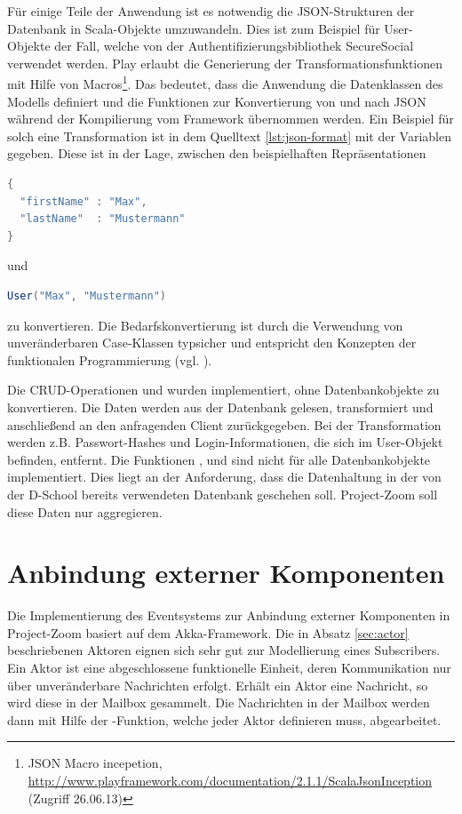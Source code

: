 Für einige Teile der Anwendung ist es notwendig die JSON-Strukturen der Datenbank in Scala-Objekte umzuwandeln. Dies ist zum Beispiel für User-Objekte der Fall, welche von der Authentifizierungsbibliothek SecureSocial verwendet werden. Play erlaubt die Generierung der Transformationsfunktionen mit Hilfe von Macros\footnote{JSON Macro incepetion, \url{http://www.playframework.com/documentation/2.1.1/ScalaJsonInception} (Zugriff 26.06.13)}. Das bedeutet, dass die Anwendung die Datenklassen des Modells definiert und die Funktionen zur Konvertierung von und nach JSON während der Kompilierung vom \gls{Framework} übernommen werden. Ein Beispiel für solch eine Transformation ist in dem Quelltext \ref{lst:json-format} mit der Variablen  gegeben. Diese ist in der Lage, zwischen den beispielhaften Repräsentationen 
\begin{lstlisting}[language=scala] 
{ 
  "firstName" : "Max", 
  "lastName"  : "Mustermann" 
}
\end{lstlisting} und 
\begin{lstlisting}[language=scala]
User("Max", "Mustermann")
\end{lstlisting} 
zu konvertieren. Die Bedarfskonvertierung ist durch die Verwendung von unveränderbaren Case-Klassen typsicher und entspricht den Konzepten der funktionalen Programmierung (vgl. \cite{functional-thinking}).

Die CRUD-Operationen  und  wurden implementiert, ohne Datenbankobjekte zu konvertieren. Die Daten werden aus der Datenbank gelesen, transformiert und anschließend an den anfragenden Client zurückgegeben. Bei der Transformation werden z.B. Passwort-Hashes und Login-Informationen, die sich im User-Objekt befinden, entfernt. Die Funktionen ,  und  sind nicht für alle Datenbankobjekte implementiert. Dies liegt an der Anforderung, dass die Datenhaltung in der von der D-School bereits verwendeten Datenbank geschehen soll. Project-Zoom soll diese Daten nur aggregieren.


\section{Anbindung externer Komponenten}

Die Implementierung des \gls{Eventsystem}s zur Anbindung externer Komponenten in Project-Zoom basiert auf dem Akka-\gls{Framework}. Die in Absatz \ref{sec:actor} beschriebenen Aktoren eignen sich sehr gut zur Modellierung eines Subscribers. Ein Aktor ist eine abgeschlossene funktionelle Einheit, deren Kommunikation nur über unveränderbare Nachrichten erfolgt. Erhält ein Aktor eine Nachricht, so wird diese in der Mailbox gesammelt. Die Nachrichten in der Mailbox werden dann mit Hilfe der -Funktion, welche jeder Aktor definieren muss, abgearbeitet. 

